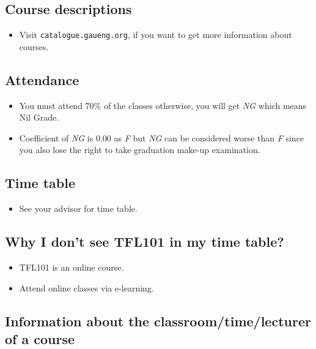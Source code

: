 \documentclass{article}
\begin{document}
\subsection{Course descriptions}

\begin{itemize}
	 \item Visit \texttt{catalogue.gaueng.org}, if you want to get more information about courses.
\end{itemize}





\subsection{Attendance}

\begin{itemize}
	\item You must attend 70\% of the classes otherwise, you will get \textit{NG} which means Nil Grade.
	\item Coefficient of \textit{NG} is 0.00 as \textit{F} but \textit{NG} can be considered worse than \textit{F} since you also lose the right to take graduation make-up examination.
\end{itemize}

\subsection{Time table}

\begin{itemize}
	\item See your advisor for time table.
\end{itemize}

\subsection{Why I don’t see TFL101 in my time table?}

\begin{itemize}
	\item TFL101 is an online course.
	\item Attend online classes via e-learning.
\end{itemize}

\subsection{Information about the classroom/time/lecturer of a course}
\end{document}
